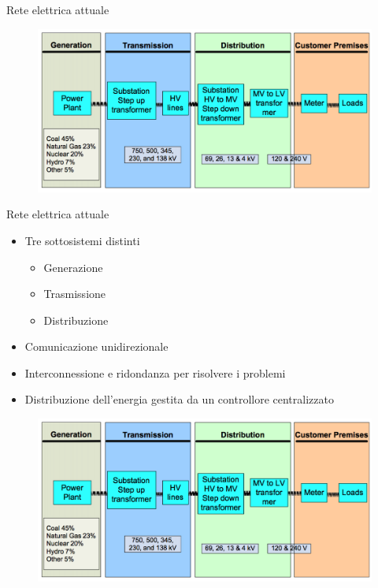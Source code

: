 \begin{frame}{Rete elettrica attuale}
	\begin{figure}[h] 
		\includegraphics[scale=0.25]{imgs/elect_grid.png}
	\end{figure}
\end{frame}

\begin{frame}{Rete elettrica attuale}
	\begin{itemize}[<+- | alert@+>]
	\item Tre sottosistemi distinti
		\begin{itemize}
		\item Generazione
		\item Trasmissione
		\item Distribuzione
		\end{itemize}
	\item Comunicazione unidirezionale
	\item Interconnessione e ridondanza per risolvere i problemi
	\item Distribuzione dell'energia gestita da un controllore centralizzato
	\end{itemize}

\begin{figure}[b]
    \includegraphics[scale=0.1]{imgs/elect_grid.png}
\end{figure}
\end{frame}

